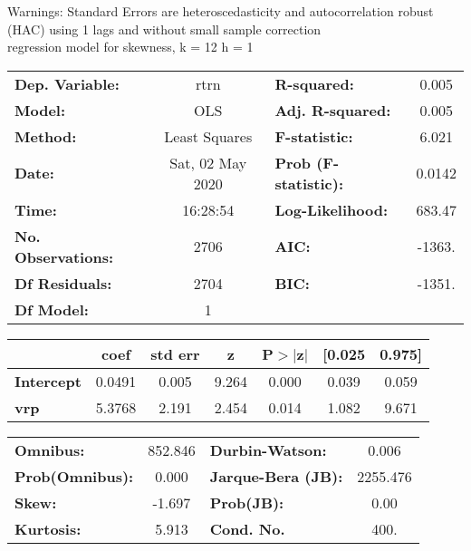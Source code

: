 Warnings: \newline
 [1] Standard Errors are heteroscedasticity and autocorrelation robust (HAC) using 1 lags and without small sample correction\\ 

regression model for skewness, k = 12 h = 1\begin{center}
\begin{tabular}{lclc}
\toprule
\textbf{Dep. Variable:}    &       rtrn       & \textbf{  R-squared:         } &     0.005   \\
\textbf{Model:}            &       OLS        & \textbf{  Adj. R-squared:    } &     0.005   \\
\textbf{Method:}           &  Least Squares   & \textbf{  F-statistic:       } &     6.021   \\
\textbf{Date:}             & Sat, 02 May 2020 & \textbf{  Prob (F-statistic):} &   0.0142    \\
\textbf{Time:}             &     16:28:54     & \textbf{  Log-Likelihood:    } &    683.47   \\
\textbf{No. Observations:} &        2706      & \textbf{  AIC:               } &    -1363.   \\
\textbf{Df Residuals:}     &        2704      & \textbf{  BIC:               } &    -1351.   \\
\textbf{Df Model:}         &           1      & \textbf{                     } &             \\
\bottomrule
\end{tabular}
\begin{tabular}{lcccccc}
                   & \textbf{coef} & \textbf{std err} & \textbf{z} & \textbf{P$> |$z$|$} & \textbf{[0.025} & \textbf{0.975]}  \\
\midrule
\textbf{Intercept} &       0.0491  &        0.005     &     9.264  &         0.000        &        0.039    &        0.059     \\
\textbf{vrp}       &       5.3768  &        2.191     &     2.454  &         0.014        &        1.082    &        9.671     \\
\bottomrule
\end{tabular}
\begin{tabular}{lclc}
\textbf{Omnibus:}       & 852.846 & \textbf{  Durbin-Watson:     } &    0.006  \\
\textbf{Prob(Omnibus):} &   0.000 & \textbf{  Jarque-Bera (JB):  } & 2255.476  \\
\textbf{Skew:}          &  -1.697 & \textbf{  Prob(JB):          } &     0.00  \\
\textbf{Kurtosis:}      &   5.913 & \textbf{  Cond. No.          } &     400.  \\
\bottomrule
\end{tabular}
\end{center}

